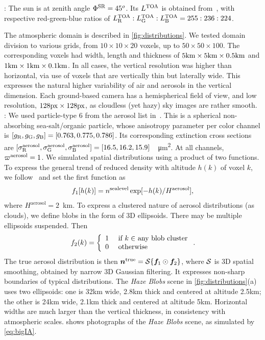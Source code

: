 \documentclass[10pt,letterpaper]{article}
\begin{document}
: The sun is at zenith angle $\Phi^{\rm
  SR}=45^o$.  Its $L^{\rm TOA}$ is obtained
from~\cite{BBradiance,sun_composition}, with respective red-green-blue
ratios of $L^{\rm TOA}_{\rm R}:L^{\rm TOA}_{\rm G}:L^{\rm TOA}_{\rm
  B}=255:236:224$.

The atmospheric domain is described in \cref{fig:distributions}.
We tested domain division to various grids, from $10\times10 \times
20$ voxels, up to $50\times50 \times 100$. The corresponding voxels
had width, length and thickness of $5{\rm km}\times 5{\rm km} \times
0.5{\rm km}$ and $1{\rm km}\times 1{\rm km} \times 0.1{\rm km}$.
In all cases, the vertical resolution was higher than horizontal, via use
of voxels that are vertically thin but laterally wide. This expresses the natural 
higher variability of air and aerosols in the vertical dimension. Each
ground-based camera has a hemispherical field of view, and low
resolution, $128 \rm{px} \times 128 \rm{px}$, as cloudless (yet hazy)
sky images are rather smooth.
\\

: We used particle-type 6 from the aerosol list
in~\cite{Martonchik2009}. This is a spherical non-absorbing
sea-salt/organic particle, whose anisotropy parameter per color
channel is $[g_{\rm R},g_{\rm G},g_{\rm B}]=[0.763,0.775,0.786]$. Its
corresponding extinction cross sections are $[\sigma^{\rm
  aerosol}_{\rm R}, \sigma^{\rm aerosol}_{\rm G}, \sigma^{\rm
  aerosol}_{\rm
  B}]=[16.5,16.2,15.9]$~\si[sticky-per]{\per\micro\meter\squared}.  At
all channels, $\varpi^{\rm aerosol}=1$. We simulated spatial
distributions using a product of two functions. To express the general
trend of reduced density with altitude $h(k)$ of voxel $k$, we
follow~\cite{Levi1980} and set the first function as
\begin{align}
  f_1[h(k)] = n^{\rm sealevel}
  \exp[-h(k)/H^\mathrm{aerosol}],
\end{align}
where $H^\mathrm{aerosol}=2$~\si{\km}. To express a clustered nature
of aerosol distributions (as clouds), we define blobs in the form of
3D ellipsoids. There may be multiple ellipsoids suspended.  Then
\begin{equation}
  f_2(k) =
  \left\{
    \begin{array}{ll}
      1  & \mbox{ if $k\in$ any blob cluster} \\
      0  & \mbox{ otherwise}
      \label{eq:f2}
    \end{array}
  \right.
  .
  \hspace{-0.05cm}
\end{equation}
The true aerosol distribution is then ${\bm n}^{\rm true}={\cal
  S}\{{\bm f}_1\odot {\bm f}_2\}$, where ${\cal S}$ is 3D spatial
smoothing, obtained by narrow 3D Gaussian filtering. It expresses
non-sharp boundaries of typical distributions. The {\em Haze Blobs}
scene in \cref{fig:distributions}(a) uses two ellipsoids: one is 32km
wide, 2.8km thick and centered at altitude 2.5km; the other is 24km
wide, 2.1km thick and centered at altitude 5km. Horizontal widths
are much larger than the vertical thickness, in consistency with
atmospheric scales.  shows
photographs of the {\em Haze Blobs} scene, as simulated by
\cref{eq:bigIA}.
\end{document}
